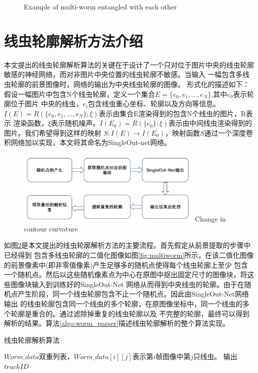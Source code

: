 \begin{figure}[!htp]
\begin{minipage}[t]{0.49\linewidth}
		\label{fig:freq}
	\end{minipage}
	{Example of multi-worm entangled with each other}%
	\label{fig:multi-worms}
	\end{figure}
	
\section{线虫轮廓解析方法介绍}
	本文提出的线虫轮廓解析算法的关键在于设计了一个只对位于图片中央的线虫轮廓敏感的神经网络，而对非图片中央位置的线虫轮廓不敏感。当输入
	一幅包含多线虫轮廓的前景图像时，网络的输出为中央线虫轮廓的图像。
	形式化的描述如下：假设一幅图片中包含N个线虫轮廓，定义一个集合$E =\{e_0,e_1,\dots,e_N\}$,其中$e_0$表示轮廓位于图片
	中央的线虫，$e_i$包含线虫重心坐标、轮廓以及方向等信息。$I(E)=R(\{e_0,e_1,\dots,e_N\};\xi)$表示由集合E渲染得到的包含N个线虫的图片，R表示
	渲染函数，$\xi$表示随机噪声。$I(E_0)=R(\{e_0\};\xi)$表示由中间线虫渲染得到的图片。我们希望得到这样的映射
	$S:I(E)\rightarrow I(E_0)$，映射函数$S$通过一个深度卷积网络加以实现，本文将其命名为SingleOut-net网络。
	\begin{figure}[htb]
	  \centering
	  \includegraphics[width=9cm]{figure/chap4/flow.jpg}
		{Change in contour curvature}
	  \label{fig:chap4:flow}
	\end{figure}
	
	如图\ref{fig:chap4:flow}是本文提出的线虫轮廓解析方法的主要流程。首先假定从前景提取的步骤中已经得到
	包含多线虫轮廓的二值化图像如图\ref{fig:multiworm}所示，在该二值化图像的前景像素中(即非零值像素)产生足够多的随机点使得每个线虫轮廓上至少
	包含一个随机点。然后以这些随机像素点为中心在原图中抠出固定尺寸的图像块，将这些图像块输入到训练好的SingleOut-Net
	网络从而得到中央线虫的轮廓。由于在随机点产生阶段，同一个线虫轮廓包含不止一个随机点。因此由SingleOut-Net网络输出
	的线虫轮廓包含同一个线虫的多个轮廓，在原图像坐标中，同一个线虫的多个轮廓是重合的。通过滤除掉重复的线虫轮廓以及
	不完整的轮廓，最终可以得到解析的结果。算法\ref{algo:worm_parser}描述线虫轮廓解析的整个算法实现。
\begin{algorithm}
\caption{线虫轮廓解析算法}
\label{algo:worm_parser}
\begin{algorithmic}[1]
\Require $Worm\_data$双重列表，$Worm\_data[i][j]$表示第$i$帧图像中第$j$只线虫。
\Ensure 输出$trackID$
\end{algorithmic}
\end{algorithm}

